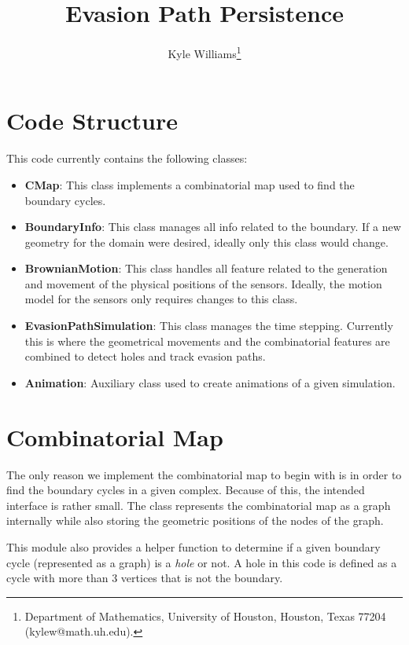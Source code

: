 \documentclass[12pt]{article}
\title{Evasion Path Persistence }
\author{
	Kyle Williams\thanks{Department of Mathematics, University of Houston, Houston, Texas 77204 (kylew@math.uh.edu).}
}
\begin{document}
	
\maketitle

\tableofcontents
\vfill
\clearpage
\let\oldtabular\tabular
\renewcommand{\tabular}[1][1.5]{\def\arraystretch{#1}\oldtabular}
\renewcommand\arraystretch{1.3}

\section{Code Structure}

This code currently contains the following classes:
\begin{itemize}
	\item {\bf CMap}: This class implements a combinatorial map used to find the boundary cycles.
	\item {\bf BoundaryInfo}: This class manages all info related to the boundary. If a new geometry for the domain were desired, ideally only this class would change.
	\item {\bf BrownianMotion}: This class handles all feature related to the generation and movement of the physical positions of the sensors. Ideally, the motion model for the sensors only requires changes to this class.
	\item {\bf EvasionPathSimulation}: This class manages the time stepping. Currently this is where the geometrical movements and the combinatorial features are combined to detect holes and track evasion paths.
	\item {\bf Animation}: Auxiliary class used to create animations of a given simulation.
\end{itemize}

\section{Combinatorial Map}
The only reason we implement the combinatorial map to begin with is in order to find the boundary cycles in a given complex. Because of this, the intended interface is rather small. The class represents the combinatorial map as a graph internally while also storing the geometric positions of the nodes of the graph.

 This module also provides a helper function to determine if a given boundary cycle (represented as a graph) is a {\it hole} or not. A hole in this code is defined as a cycle with more than 3 vertices that is not the boundary.
\end{document}

